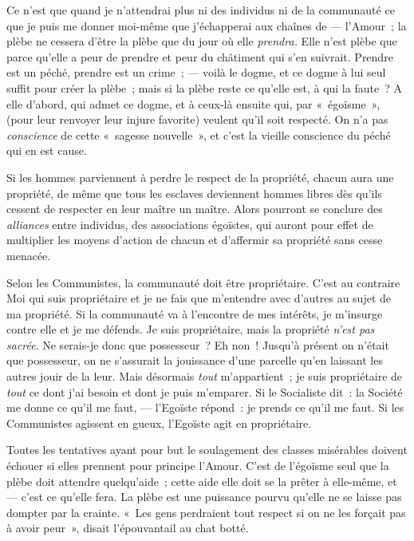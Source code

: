 \documentclass[french,twoside]{book} %
\begin{document}
Ce n’est que quand je n’attendrai plus ni des individus ni de la communauté ce que je puis me donner moi-même que j’échapperai aux chaînes de — l’Amour ; la plèbe ne cessera d’être la plèbe que du jour où elle \emph{prendra.} Elle n’est plèbe que parce qu’elle a peur de prendre et peur du châtiment qui s’en suivrait. Prendre est un péché, prendre est un crime ; — voilà le dogme, et ce dogme à lui seul suffit pour créer la plèbe ; mais si la plèbe reste ce qu’elle est, à qui la faute ? A elle d’abord, qui admet ce dogme, et à ceux-là ensuite qui, par « égoïsme », (pour leur renvoyer leur injure favorite) veulent qu’il soit respecté. On n’a pas \emph{conscience} de cette « sagesse nouvelle », et c’est la vieille conscience du péché qui en est cause.\par
Si les hommes parviennent à perdre le respect de la propriété, chacun aura une propriété, de même que tous les esclaves deviennent hommes libres dès qu’ils cessent de respecter en leur maître un maître. Alors pourront se conclure des \emph{alliances} entre individus, des associations égoïstes, qui auront pour effet de multiplier les moyens d’action de chacun et d’affermir sa propriété sans cesse menacée.\par
Selon les Communistes, la communauté doit être propriétaire. C’est au contraire Moi qui suis propriétaire et je ne fais que m’entendre avec d’autres au  sujet de ma propriété. Si la communauté va à l’encontre de mes intérêts, je m’insurge contre elle et je me défends. Je suis propriétaire, mais la propriété \emph{n’est pas sacrée}. Ne serais-je donc que possesseur ? Eh non ! Jusqu’à présent on n’était que possesseur, on ne s’assurait la jouissance d’une parcelle qu’en laissant les autres jouir de la leur. Mais désormais \emph{tout }m’appartient ; je suis propriétaire de \emph{tout} ce dont j’ai besoin et dont je puis m’emparer. Si le Socialiste dit : la Société me donne ce qu’il me faut, — l’Egoïste répond : je prends ce qu’il me faut. Si les Communistes agissent en gueux, l’Egoïste agit en propriétaire.\par
Toutes les tentatives ayant pour but le soulagement des classes misérables doivent échouer si elles prennent pour principe l’Amour. C’est de l’égoïsme seul que la plèbe doit attendre quelqu’aide ; cette aide elle doit se la prêter à elle-même, et — c’est ce qu’elle fera. La plèbe est une puissance pourvu qu’elle ne se laisse pas dompter par la crainte. « Les gens perdraient tout respect si on ne les forçait pas à avoir peur », disait l’épouvantail au chat botté.\par
\end{document}
